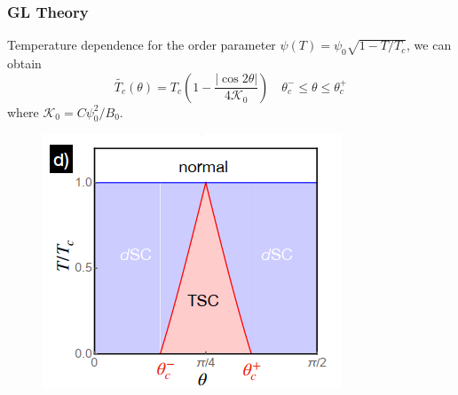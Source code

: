 \documentclass{beamer}
\begin{document}
\begin{frame}
\frametitle{GL Theory}
Temperature dependence for the order parameter $\psi(T)=\psi_0\sqrt{1-T/T_c}$, we can obtain
\begin{equation}
\tilde{T_c}(\theta)=T_c(1-\frac{|\cos 2\theta|}{4\mathcal{K}_0})\quad\theta^{-}_c\le\theta\le\theta^{+}_c
\end{equation}
where $\mathcal{K}_0=C\psi_0^2/B_0$. 
\begin{figure}
\centering
\includegraphics[scale=0.5]{pic/p7.png}
\end{figure}
\end{frame}
\end{document}
